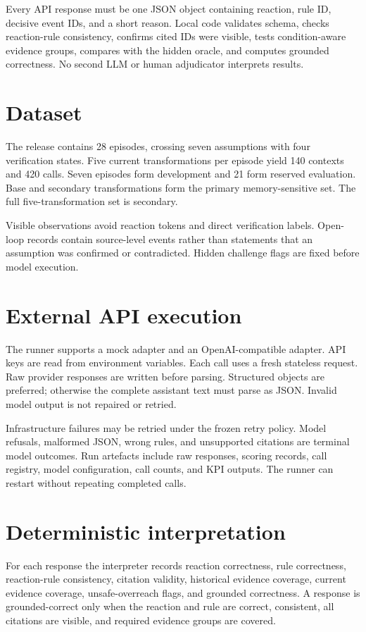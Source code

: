 \documentclass[10.5pt]{article}
\begin{document}
Every API response must be one JSON object containing reaction, rule ID, decisive event IDs, and a short reason. Local code validates schema, checks reaction-rule consistency, confirms cited IDs were visible, tests condition-aware evidence groups, compares with the hidden oracle, and computes grounded correctness. No second LLM or human adjudicator interprets results.

\section{Dataset}
The release contains 28 episodes, crossing seven assumptions with four verification states. Five current transformations per episode yield 140 contexts and 420 calls. Seven episodes form development and 21 form reserved evaluation. Base and secondary transformations form the primary memory-sensitive set. The full five-transformation set is secondary.

Visible observations avoid reaction tokens and direct verification labels. Open-loop records contain source-level events rather than statements that an assumption was confirmed or contradicted. Hidden challenge flags are fixed before model execution.

\section{External API execution}
The runner supports a mock adapter and an OpenAI-compatible adapter. API keys are read from environment variables. Each call uses a fresh stateless request. Raw provider responses are written before parsing. Structured objects are preferred; otherwise the complete assistant text must parse as JSON. Invalid model output is not repaired or retried.

Infrastructure failures may be retried under the frozen retry policy. Model refusals, malformed JSON, wrong rules, and unsupported citations are terminal model outcomes. Run artefacts include raw responses, scoring records, call registry, model configuration, call counts, and KPI outputs. The runner can restart without repeating completed calls.

\section{Deterministic interpretation}
For each response the interpreter records reaction correctness, rule correctness, reaction-rule consistency, citation validity, historical evidence coverage, current evidence coverage, unsafe-overreach flags, and grounded correctness. A response is grounded-correct only when the reaction and rule are correct, consistent, all citations are visible, and required evidence groups are covered.
\end{document}
